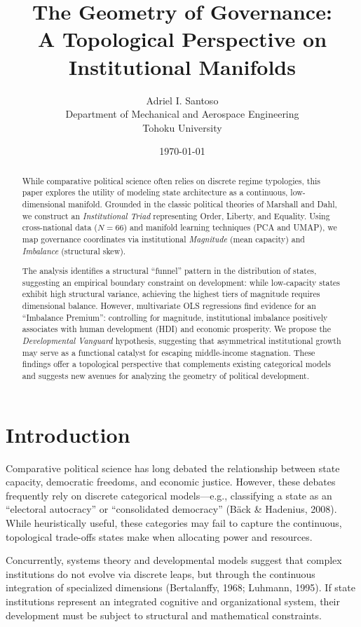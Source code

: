 \documentclass[12pt]{article}
\title{The Geometry of Governance: \\ A Topological Perspective on Institutional Manifolds}
\author{
Adriel I. Santoso \\
Department of Mechanical and Aerospace Engineering \\
Tohoku University
}
\date{\today}
\begin{document}
\maketitle

\begin{abstract}
    While comparative political science often relies on discrete regime typologies, this paper explores the utility of modeling state architecture as a continuous, low-dimensional manifold. Grounded in the classic political theories of Marshall and Dahl, we construct an \textit{Institutional Triad} representing Order, Liberty, and Equality. Using cross-national data ($N=66$) and manifold learning techniques (PCA and UMAP), we map governance coordinates via institutional \textit{Magnitude} (mean capacity) and \textit{Imbalance} (structural skew).

    The analysis identifies a structural ``funnel'' pattern in the distribution of states, suggesting an empirical boundary constraint on development: while low-capacity states exhibit high structural variance, achieving the highest tiers of magnitude requires dimensional balance. However, multivariate OLS regressions find evidence for an ``Imbalance Premium'': controlling for magnitude, institutional imbalance positively associates with human development (HDI) and economic prosperity. We propose the \textit{Developmental Vanguard} hypothesis, suggesting that asymmetrical institutional growth may serve as a functional catalyst for escaping middle-income stagnation. These findings offer a topological perspective that complements existing categorical models and suggests new avenues for analyzing the geometry of political development.
\end{abstract}

\section{Introduction}

Comparative political science has long debated the relationship between state capacity, democratic freedoms, and economic justice. However, these debates frequently rely on discrete categorical models—e.g., classifying a state as an ``electoral autocracy'' or ``consolidated democracy'' (Bäck \& Hadenius, 2008). While heuristically useful, these categories may fail to capture the continuous, topological trade-offs states make when allocating power and resources.

Concurrently, systems theory and developmental models suggest that complex institutions do not evolve via discrete leaps, but through the continuous integration of specialized dimensions (Bertalanffy, 1968; Luhmann, 1995). If state institutions represent an integrated cognitive and organizational system, their development must be subject to structural and mathematical constraints.
\end{document}
